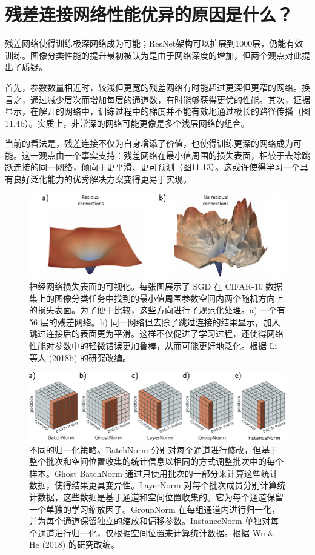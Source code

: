 \documentclass[lang=cn,newtx,10pt,scheme=chinese]{elegantbook}
\begin{document}
\section{残差连接网络性能优异的原因是什么？}
残差网络使得训练极深网络成为可能；ResNet架构可以扩展到1000层，仍能有效训练。图像分类性能的提升最初被认为是由于网络深度的增加，但两个观点对此提出了质疑。

首先，参数数量相近时，较浅但更宽的残差网络有时能超过更深但更窄的网络。换言之，通过减少层次而增加每层的通道数，有时能够获得更优的性能。其次，证据显示，在解开的网络中，训练过程中的梯度并不能有效地通过极长的路径传播（图11.4b）。实质上，非常深的网络可能更像是多个浅层网络的组合。

当前的看法是，残差连接不仅为自身增添了价值，也使得训练更深的网络成为可能。这一观点由一个事实支持：残差网络在最小值周围的损失表面，相较于去除跳跃连接的同一网络，倾向于更平滑、更可预测（图11.13）。这或许使得学习一个具有良好泛化能力的优秀解决方案变得更易于实现。

\begin{figure}[ht!]
\centering
\includegraphics[width=0.7\linewidth]{PDFFigures/UDLChap11PDF/ResidualSurface.pdf}
\caption{神经网络损失表面的可视化。每张图展示了 SGD 在 CIFAR-10 数据集上的图像分类任务中找到的最小值周围参数空间内两个随机方向上的损失表面。为了便于比较，这些方向进行了规范化处理。a) 一个有 56 层的残差网络。b) 同一网络但去除了跳过连接的结果显示，加入跳过连接后的表面更为平滑。这样不仅促进了学习过程，还使得网络性能对参数中的轻微错误更加鲁棒，从而可能更好地泛化。根据 Li 等人 (2018b) 的研究改编。}
\end{figure}


\begin{figure}[ht!]
\centering
\includegraphics[width=0.7\linewidth]{PDFFigures/UDLChap11PDF/ResidualNormTypes.pdf}
\caption{不同的归一化策略。BatchNorm 分别对每个通道进行修改，但基于整个批次和空间位置收集的统计信息以相同的方式调整批次中的每个样本。Ghost BatchNorm 通过只使用批次的一部分来计算这些统计数据，使得结果更具变异性。LayerNorm 对每个批次成员分别计算统计数据，这些数据是基于通道和空间位置收集的。它为每个通道保留一个单独的学习缩放因子。GroupNorm 在每组通道内进行归一化，并为每个通道保留独立的缩放和偏移参数。InstanceNorm 单独对每个通道进行归一化，仅根据空间位置来计算统计数据。根据 Wu \& He (2018) 的研究改编。}
\end{figure}
\end{document}
